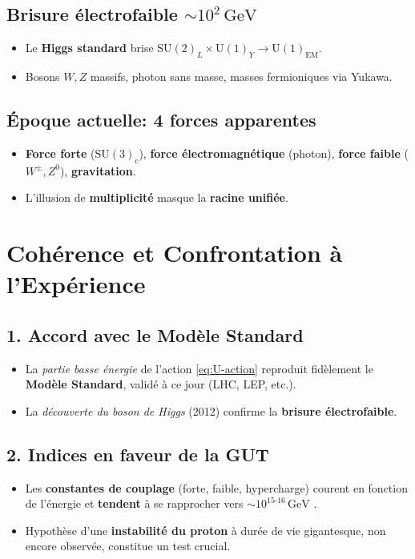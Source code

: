 \documentclass[12pt]{article}
\begin{document}
\subsection{Brisure \'electrofaible \(\sim 10^2\,\mathrm{GeV}\)}
\begin{itemize}
\item Le \textbf{Higgs standard} brise $\mathrm{SU}(2)_L\times\mathrm{U}(1)_Y\to\mathrm{U}(1)_{\mathrm{EM}}$. 
\item Bosons $W, Z$ massifs, photon sans masse, masses fermioniques via Yukawa.
\end{itemize}

\subsection{\'Epoque actuelle: 4 forces apparentes}
\begin{itemize}
    \item \textbf{Force forte} ($\mathrm{SU}(3)_\text{c}$), \textbf{force \'electromagn\'etique} (photon), \textbf{force faible} ($W^\pm, Z^0$), \textbf{gravitation}.  
    \item L'illusion de \textbf{multiplicit\'e} masque la \textbf{racine unifi\'ee}.
\end{itemize}

\section{Coh\'erence et Confrontation \`a l'Exp\'erience}
\label{sec:coherence}

\subsection{1. Accord avec le Mod\`ele Standard}
\begin{itemize}
    \item La \emph{partie basse \'energie} de l'action \eqref{eq:U-action} 
          reproduit fid\`element le \textbf{Mod\`ele Standard}, 
          valid\'e \`a ce jour (LHC, LEP, etc.). 
    \item La \emph{d\'ecouverte du boson de Higgs} (2012) confirme la \textbf{brisure \'electrofaible}.
\end{itemize}

\subsection{2. Indices en faveur de la GUT}
\begin{itemize}
    \item Les \textbf{constantes de couplage} (forte, faible, hypercharge) 
          \og courent\fg{} en fonction de l'\'energie 
          et \textbf{tendent} \`a se rapprocher vers $\sim10^{15\text{-}16}\,\mathrm{GeV}$ \cite{amaldi1991precision}.
    \item Hypoth\`ese d'une \textbf{instabilit\'e du proton} \`a dur\'ee de vie gigantesque, 
          non encore observ\'ee, constitue un test crucial.
\end{itemize}
\end{document}
